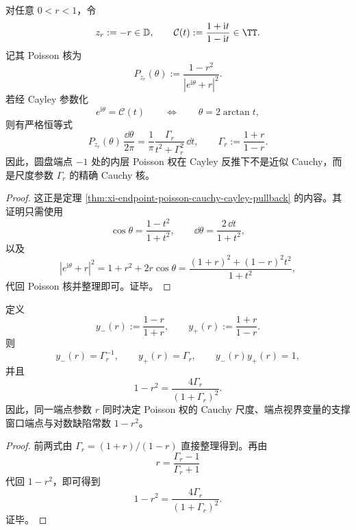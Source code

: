 \begin{theorem}\label{thm:conclusion-endpoint-poisson-cayley-cauchy-exact-scale}
对任意 \(0<r<1\)，令
\[
z_r:=-r\in\mathbb D,
\qquad
\mathcal C(t):=\frac{1+\mathrm{i}t}{1-\mathrm{i}t}\in\TT.
\]
记其 Poisson 核为
\[
P_{z_r}(\theta):=\frac{1-r^2}{|e^{\mathrm{i}\theta}+r|^2}.
\]
若经 Cayley 参数化
\[
e^{\mathrm{i}\theta}=\mathcal C(t)
\qquad\Longleftrightarrow\qquad
\theta=2\arctan t,
\]
则有严格恒等式
\[
P_{z_r}(\theta)\,\frac{\dd\theta}{2\pi}
=
\frac{1}{\pi}\frac{\Gamma_r}{t^2+\Gamma_r^2}\,\dd t,
\qquad
\Gamma_r:=\frac{1+r}{1-r}.
\]
因此，圆盘端点 \(-1\) 处的内层 Poisson 权在 Cayley 反推下不是近似 Cauchy，而是尺度参数 \(\Gamma_r\) 的精确 Cauchy 核。
\end{theorem}
\begin{proof}
这正是定理 \ref{thm:xi-endpoint-poisson-cauchy-cayley-pullback} 的内容。其证明只需使用
\[
\cos\theta=\frac{1-t^2}{1+t^2},
\qquad
\dd\theta=\frac{2\,\dd t}{1+t^2},
\]
以及
\[
|e^{\mathrm{i}\theta}+r|^2
=
1+r^2+2r\cos\theta
=
\frac{(1+r)^2+(1-r)^2t^2}{1+t^2},
\]
代回 Poisson 核并整理即可。证毕。
\end{proof}

\begin{corollary}\label{cor:conclusion-endpoint-radius-cauchy-window-triple-identity}
定义
\[
y_-(r):=\frac{1-r}{1+r},
\qquad
y_+(r):=\frac{1+r}{1-r}.
\]
则
\[
y_-(r)=\Gamma_r^{-1},
\qquad
y_+(r)=\Gamma_r,
\qquad
y_-(r)y_+(r)=1,
\]
并且
\[
1-r^2=\frac{4\Gamma_r}{(1+\Gamma_r)^2}.
\]
因此，同一端点参数 \(r\) 同时决定 Poisson 权的 Cauchy 尺度、端点视界变量的支撑窗口端点与对数缺陷常数 \(1-r^2\)。
\end{corollary}
\begin{proof}
前两式由
\(
\Gamma_r=(1+r)/(1-r)
\)
直接整理得到。再由
\[
r=\frac{\Gamma_r-1}{\Gamma_r+1}
\]
代回 \(1-r^2\)，即可得到
\[
1-r^2=\frac{4\Gamma_r}{(1+\Gamma_r)^2}.
\]
证毕。
\end{proof}

